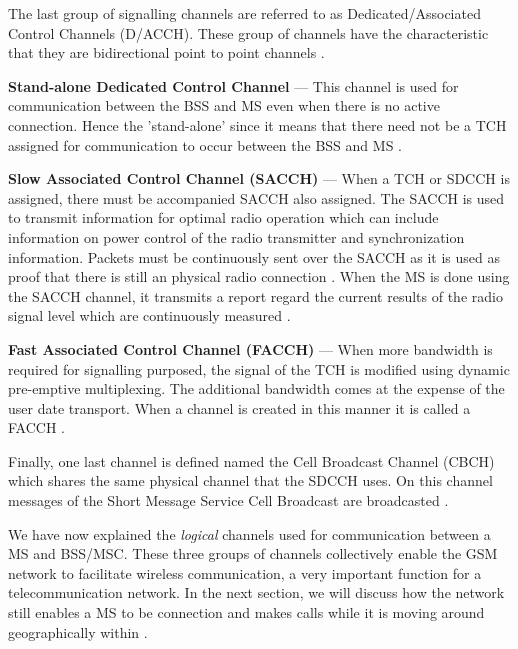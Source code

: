 The last group of signalling channels are referred to as Dedicated/Associated Control Channels (D/ACCH). These group of channels have the characteristic that they are bidirectional point to point channels \cite{GSMArchitectureProtocolsServices}.
\begin{description}
\item{\textbf{Stand-alone Dedicated Control Channel}} --- This channel is used for communication between the BSS and MS even when there is no active connection. Hence the 'stand-alone' since it means that there need not be a TCH assigned for communication to occur between the BSS and MS \cite{GSMArchitectureProtocolsServices}.
\item{\textbf{Slow Associated Control Channel (SACCH)}} --- When a TCH or SDCCH is assigned, there must be accompanied SACCH also assigned. The SACCH is used to transmit information for optimal radio operation which can include information on power control of the radio transmitter and synchronization information. Packets must be continuously sent over the SACCH as it is used as proof that there is still an physical radio connection \cite{GSMArchitectureProtocolsServices}. When the MS is done using the SACCH channel, it transmits a report regard the current results of the radio signal level which are continuously measured \cite{GSMArchitectureProtocolsServices}.
\item{\textbf{Fast Associated Control Channel (FACCH)}} --- When more bandwidth is required for signalling purposed, the signal of the TCH is modified using dynamic pre-emptive multiplexing. The additional bandwidth comes at the expense of the user date transport. When a channel is created in this manner it is called a FACCH \cite{GSMArchitectureProtocolsServices}.
\end{description}

Finally, one last channel is defined named the Cell Broadcast Channel (CBCH) which shares the same physical channel that the SDCCH uses. On this channel messages of the Short Message Service Cell Broadcast are broadcasted \cite{GSMArchitectureProtocolsServices}.

We have now explained the \emph{logical} channels used for communication between a MS and BSS/MSC. These three groups of channels collectively enable the GSM network to facilitate wireless communication, a very important function for a telecommunication network. In the next section, we will discuss how the network still enables a MS to be connection and makes calls while it is moving around geographically within .
